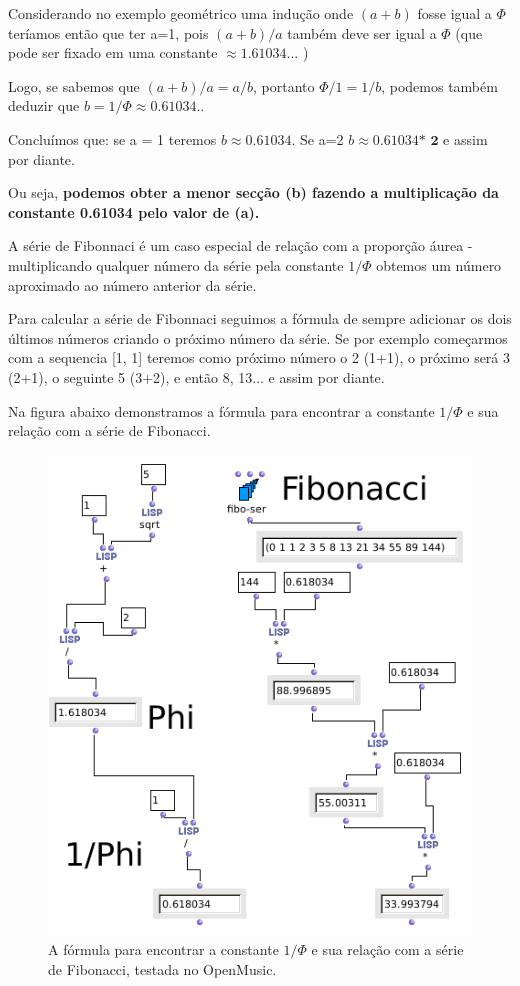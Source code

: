 \documentclass[
	12pt,				%
	openright,			%
	twoside,			%
	a4paper,			%
	english,			%
	french,				%
	spanish,			%
	brazil				%
	]{abntex2}
\begin{document}
Considerando no exemplo geométrico uma indução onde $(a+b)$ fosse igual a $\Phi$ teríamos então que ter a=1, pois $(a+b)/a$ também deve ser igual a $\Phi$ (que pode ser fixado em uma constante  $ \approx 1.61034... $ ) 

Logo, se sabemos que $(a+b)/a = a/b $, portanto $\Phi/1 = 1/b$, podemos também deduzir que $b = 1/\Phi \approx 0.61034.. $ 

Concluímos que: se a = 1 teremos $b \approx 0.61034 $. Se a=2 $b \approx 0.61034 \textbf{* 2} $ e assim por diante.

Ou seja, \textbf{podemos obter a menor secção (b) fazendo a multiplicação da constante 0.61034 pelo valor de (a).}

A série de Fibonnaci é um caso especial de relação com a proporção áurea - multiplicando qualquer número da série pela constante $1/\Phi$ obtemos um número aproximado ao número anterior da série.

Para calcular a série de Fibonnaci seguimos a fórmula de sempre adicionar os dois últimos números criando o próximo número da série. Se por exemplo começarmos com a sequencia [1, 1] teremos como próximo número o 2 (1+1), o próximo será 3 (2+1), o seguinte 5 (3+2), e então 8, 13... e assim por diante. 

Na figura abaixo demonstramos a fórmula para encontrar a constante $1/\Phi$ e sua relação com a série de Fibonacci.

\begin{figure}[!h]
	\caption{\label{fig_grafico}A fórmula para encontrar a constante $1/\Phi$ e sua relação com a série de Fibonacci, testada no OpenMusic. }
	\begin{center}
	    \includegraphics[scale=0.45]{OM_settheory/aurea.png}
	\end{center}
\end{figure}	
\end{document}
